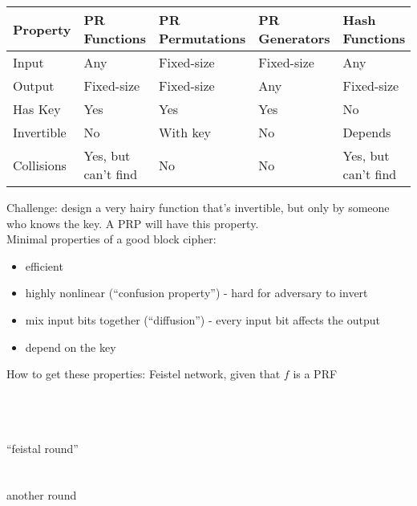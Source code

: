 \begin{center}
\begin{tabular}{l|llll}
 Property    &  PR Functions         &  PR Permutations  &  PR Generators  &  Hash Functions       \\
\hline
 Input       &  Any                  &  Fixed-size       &  Fixed-size     &  Any                  \\
 Output      &  Fixed-size           &  Fixed-size       &  Any            &  Fixed-size           \\
 Has Key     &  Yes                  &  Yes              &  Yes            &  No                   \\
 Invertible  &  No                   &  With key         &  No             &  Depends              \\
 Collisions  &  Yes, but can't find  &  No               &  No             &  Yes, but can't find  \\
\end{tabular}
\end{center}

Challenge: design a very hairy function that's invertible, but only by someone
who knows the key. A PRP will have this property.\\

Minimal properties of a good block cipher:
\begin{itemize}
    \item efficient
    \item highly nonlinear (``confusion property'') - hard for adversary to
        invert
    \item mix input bits together (``diffusion'') - every input bit affects the output
    \item depend on the key
\end{itemize}

How to get these properties: Feistel network, given that $f$ is a PRF

\\
\\
\makebox[6cm]{\makebox[1cm]{$\downarrow$}\makebox[4cm]{}\makebox[1cm]{$\downarrow$}}\\
   ``feistal round''\\
\makebox[6cm]{\makebox[1cm]{$\downarrow$}\makebox[4cm]{}\makebox[1cm]{$\downarrow$}}\\
\makebox[6cm]{------------------------------------------------}\\
   another round\\
\makebox[6cm]{\makebox[1cm]{$\downarrow$}\makebox[4cm]{}\makebox[1cm]{$\downarrow$}}\\

